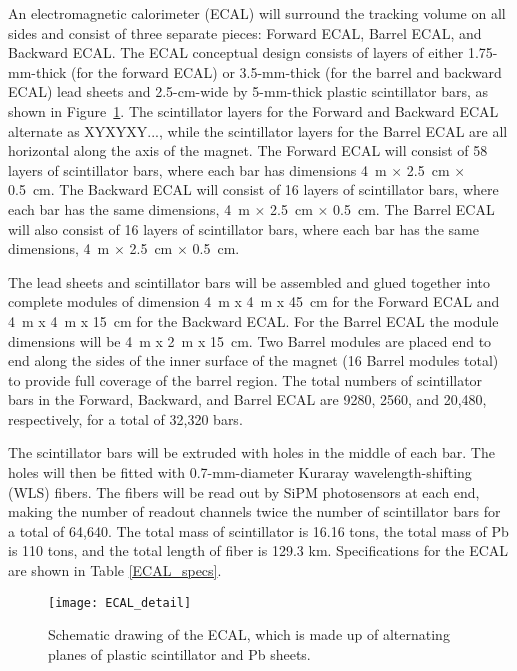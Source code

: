 \documentclass[aps,prl,preprint,groupedaddress]{revtex4}
\begin{document}
An electromagnetic calorimeter 
(ECAL) will surround the tracking volume on all sides and consist of three separate pieces: Forward ECAL, Barrel ECAL, and Backward ECAL. 
The ECAL conceptual design 
consists of 
layers of either 1.75-mm-thick (for the forward ECAL) or 3.5-mm-thick 
(for the barrel and backward ECAL) lead sheets and 2.5-cm-wide by 5-mm-thick 
plastic scintillator bars,
as shown in Figure~\ref{ECAL_detail}. The scintillator layers for the
Forward and Backward ECAL alternate as XYXYXY..., while the scintillator 
layers for the Barrel ECAL are all horizontal along the axis of the magnet.
The Forward ECAL will consist of 58 layers of scintillator bars, where each
bar has dimensions 4~m $\times$ 2.5~cm $\times$ 0.5~cm. The
Backward ECAL will consist of 16 layers of scintillator bars, where each 
bar has the same dimensions, 4~m $\times$ 2.5~cm $\times$ 0.5~cm. The Barrel ECAL will also consist 
of 16 layers of scintillator bars, where each bar has the same dimensions, 
4~m $\times$ 2.5~cm $\times$ 0.5~cm. 

The lead sheets and scintillator bars will be assembled and glued together
into complete modules of dimension 4~m x 4~m x 45~cm for the Forward ECAL and
4~m x 4~m x 15~cm for the Backward ECAL. For the Barrel ECAL the module 
dimensions will be 4~m x 2~m x 15~cm. Two Barrel modules are placed end to
end along the sides of the inner surface of the magnet (16 Barrel modules
total) to provide full coverage of the barrel region.
The total numbers of scintillator bars in the
Forward, Backward, and Barrel ECAL are 9280, 2560, and 20,480, respectively, 
for a total of 32,320 bars. 

The scintillator bars will be extruded with 
holes in the middle of each bar. The
holes will then be fitted with 0.7-mm-diameter Kuraray wavelength-shifting (WLS) fibers.
The fibers will be read out by SiPM photosensors at each end, making the number of 
readout channels twice the number of scintillator bars 
for a total of 64,640. The total mass of scintillator is 16.16 tons, the total mass of Pb is 110 tons, and
the total length of fiber is 129.3 km.
Specifications for the ECAL are shown in Table \ref{ECAL_specs}.

\begin{figure}
\begin{center}
\texttt{[image: ECAL\_detail]}
\caption[Schematic drawing of the ECAL]{\label{ECAL_detail} Schematic drawing of the ECAL, which is made up of alternating planes
of plastic scintillator and Pb sheets.}
\end{center}
\end{figure}
\end{document}
